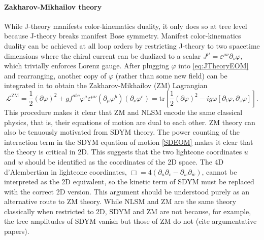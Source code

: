 \documentclass[11pt,letter]{article}
\begin{document}
\paragraph{Zakharov-Mikhailov theory}
\label{sec:ZMTheory}
While J-theory manifests color-kinematics duality, it only does so at tree level because J-theory breaks manifest Bose symmetry.
Manifest color-kinematics duality can be achieved at all loop orders by restricting J-theory to two spacetime dimensions where the chiral current can be dualized to a scalar $J^\mu = \varepsilon^{\mu\nu} \partial_\nu \varphi$, which trivially enforces Lorenz gauge.
After plugging $\varphi$ into \cref{eq:JTheoryEOM} and rearranging, another copy of $\varphi$ (rather than some new field) can be integrated in to obtain the Zakharov-Mikhailov (ZM) Lagrangian
\begin{equation}
\label{eq:ZMLagrangian}
\mathcal{L}^{\text{ZM}} = \frac{1}{2}(\partial \varphi)^2 + g f^{abc} \varphi^a \varepsilon^{\mu\nu}(\partial_\mu \varphi^b)( \partial_\nu \varphi^c) =  \text{tr}\left[\frac{1}{2}(\partial \varphi)^2-i g \varphi [\partial_t \varphi, \partial_z \varphi ]\right] .
\end{equation}
This procedure makes it clear that ZM and NLSM encode the same classical physics, that is, their equations of motion are dual to each other.
ZM theory can also be tenuously motivated from SDYM theory.
The power counting of the interaction term in the SDYM equation of motion \cref{SDEOM} makes it clear that the theory is critical in 2D.
This suggests that the two lightcone coordinates $u$ and $w$ should be identified as the coordinates of the 2D space.
The 4D d'Alembertian in lightcone coordinates, $\Box = 4 (\partial_u \partial_v - \partial_w \partial_{\bar{w}})$, cannot be interpreted as the 2D equivalent, so the kinetic term of SDYM must be replaced with the correct 2D version.
This argument should be understood purely as an alternative route to ZM theory.
While NLSM and ZM are the same theory classically when restricted to 2D, SDYM and ZM are not because, for example, the tree amplitudes of SDYM vanish but those of ZM do not (cite argumentative papers).
\end{document}
